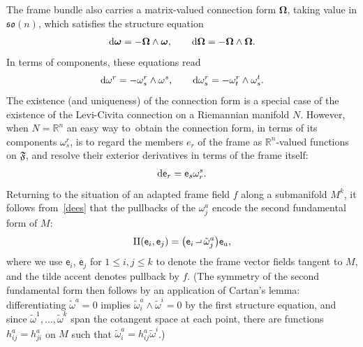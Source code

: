 \documentclass[10pt,a4paper]{amsart}
\def\R{\mathbb{R}}
\def\ve{\mathsf{e}}
\def\vomega{\boldsymbol{\omega}}
\def\vOmega{\boldsymbol{\Omega}}
\def\vOmega{\boldsymbol{\Omega}}
\def\II{\operatorname{II}} %
\def\F{\mathfrak{F}}
\def\w{\omega}
\def\tw{\tilde\omega}
\newcommand{\intprod}{\mathbin{\raisebox{.4ex}{\hbox{\vrule height .5pt width 5pt depth 0pt \vrule height 3pt width .5pt depth 0pt}}}}
\numberwithin{equation}{section}
\begin{document}
The frame bundle also carries a matrix-valued connection form $\vOmega$, taking value in $\mathfrak{so}(n)$, which satisfies the structure equation
\begin{gather*}
{\rm d}\vomega = -\vOmega \wedge \vomega, \qquad {\rm d}\vOmega = - \vOmega \wedge \vOmega.
\end{gather*}
In terms of components, these equations read
\begin{gather} \label{streq}
{\rm d}\w^r = -\w^r_s \wedge \w^s, \qquad {\rm d}\w^r_s = -\w^r_t \wedge \w^t_s.
\end{gather}
The existence (and uniqueness) of the connection form is a special case of the existence of the Levi-Civita connection on a Riemannian manifold $N$. However, when $N=\R^n$ an easy way to~obtain the connection form, in terms of its components $\omega^r_s$, is to regard the members $e_r$ of the frame as $\R^n$-valued functions on $\F$, and resolve their exterior derivatives in terms of the frame itself:
\begin{gather} \label{dees}
{\rm d}\ve_r = \ve_s \omega^s_r.
\end{gather}
Returning to the situation of an adapted frame field $f$ along a submanifold $M^k$, it follows from~\eqref{dees} that the pullbacks of the $\w^a_j$ encode the second fundamental form of $M$:
\begin{gather} \label{fundyomega}
\II(\ve_i, \ve_j) = \big(\ve_i \intprod \tw^a_j\big) \ve_a,
\end{gather}
where we use $\ve_i$, $\ve_j$ for $1\le i,j \le k$ to denote the frame vector fields tangent to $M$, and the tilde accent denotes pullback by $f$. (The symmetry of the second fundamental form then follows by an application of Cartan's lemma: differentiating $\tw^a = 0$ implies $\tw^a_i \wedge \tw^i = 0$ by the first structure equation, and since $\tw^1, \dots, \tw^k$ span the cotangent space at each point, there are functions $h^a_{ij} = h^a_{ji}$ on $M$ such that $\tw^a_i = h^a_{ij} \tw^i$.)
\end{document}
